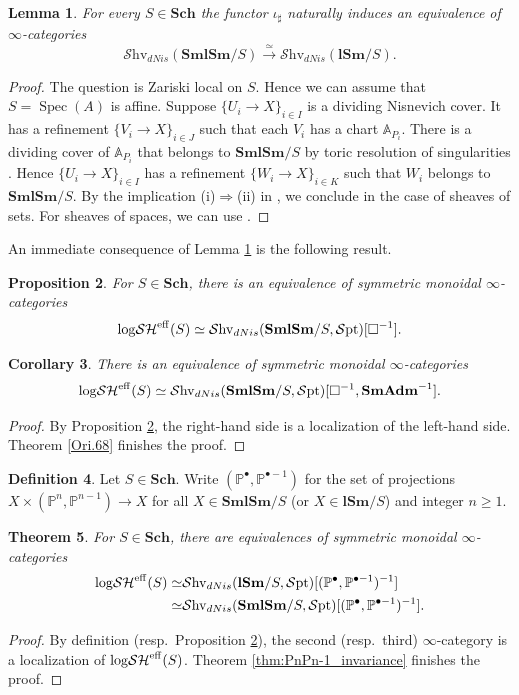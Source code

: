 \documentclass[11pt, a4paper]{amsart}
\newtheorem{thm}{Theorem}[subsection]
\newtheorem{prop}[thm]{Proposition}
\newtheorem{lem}[thm]{Lemma}
\newtheorem{cor}[thm]{Corollary}
\theoremstyle{definition}
\newtheorem{df}[thm]{Definition}
\numberwithin{equation}{subsection}
\renewcommand{\P}{\mathbb{P}}
\newcommand{\A}{\mathbb{A}}
\newcommand{\Sch}{\mathbf{Sch}}
\newcommand{\lSm}{\mathbf{lSm}}
\newcommand{\SmlSm}{\mathbf{SmlSm}}
\providecommand{\Spec}[1]{\operatorname{Spec}(#1)} 	%
\newcommand{\SmAdm}{\mathbf{SmAdm}}
\newcommand{\sharpp}{\sharp}
\newcommand{\eff}{{\rm eff}}
\newcommand{\infShv}{\mathcal{S}\mathrm{hv}}
\newcommand{\infSpt}{\mathcal{S}\mathrm{pt}}
\newcommand{\inflogSH}{\mathrm{log}\mathcal{SH}}
\begin{document}
\begin{lem}
\label{logSH.12}
For every $S\in \Sch$ the functor $\iota_\sharpp$ naturally induces an equivalence of $\infty$-categories
\[
\infShv_{dNis}(\SmlSm/S)
\xrightarrow{\simeq}
\infShv_{dNis}(\lSm/S).
\]
\end{lem}
\begin{proof}
The question is Zariski local on $S$. Hence we can assume that $S=\Spec{A}$ is affine.
Suppose $\{U_i\to X\}_{i\in I}$ is a dividing Nisnevich cover.
It has a refinement $\{V_i\to X\}_{i\in J}$ such that each $V_i$ has a chart $\A_{P_i}$.
There is a dividing cover of $\A_{P_i}$ that belongs to $\SmlSm/S$ by toric resolution of singularities
\cite[Theorem 11.1.9]{CLStoric}.
Hence $\{U_i\to X\}_{i\in I}$ has a refinement $\{W_i\to X\}_{i\in K}$ such that $W_i$ belongs to $\SmlSm/S$.
By the implication (i)$\Rightarrow$(ii) in \cite[Th\'eor\`eme III.4.1]{SGA4}, we conclude in the case of sheaves of sets. For sheaves of spaces, 
we can use \cite[Lemma 2.1.4]{AGV}.
\end{proof}
An immediate consequence of Lemma \ref{logSH.12} is the following result.
\begin{prop}
\label{logSH.14}
For $S\in \Sch$,
there is an equivalence of symmetric monoidal $\infty$-categories
\[
\inflogSH^\eff(S)
\simeq
\infShv_{dNis}(\SmlSm/S,\infSpt)[\square^{-1}].
\]
\end{prop}


\begin{cor}
\label{ProplogSH.9}
There is an equivalence of symmetric monoidal $\infty$-categories
\[
\inflogSH^\eff(S)
\simeq
\infShv_{dNis}(\SmlSm/S,\infSpt)[\square^{-1},\SmAdm^{-1}].
\]
\end{cor}
\begin{proof}
By Proposition \ref{logSH.14},
the right-hand side is a localization of the left-hand side.
Theorem \ref{Ori.68} finishes the proof.
\end{proof}
\begin{df}
Let $S\in \Sch$.
Write $(\P^\bullet,\P^{\bullet-1})$ for the set of projections $X\times (\P^n,\P^{n-1})\to X$ for all $X\in \SmlSm/S$ (or $X\in \lSm/S$) and integer $n\geq 1$.
\end{df}


\begin{thm}
\label{logSH.7}
For $S\in \Sch$, there are equivalences of symmetric monoidal $\infty$-categories
\begin{align*}
\inflogSH^\eff(S)
\simeq &
\infShv_{dNis}(\lSm/S, \infSpt)[(\P^\bullet,\P^{\bullet-1})^{-1}]
\\
\simeq &
\infShv_{dNis}(\SmlSm/S, \infSpt)[(\P^\bullet,\P^{\bullet-1})^{-1}].
\end{align*}
\end{thm}
\begin{proof}
By definition (resp.\ Proposition \ref{logSH.14}), the second (resp.\ third) $\infty$-category is a localization of $\inflogSH^\eff(S)$.
Theorem \ref{thm:PnPn-1_invariance} finishes the proof.
\end{proof}
\end{document}
